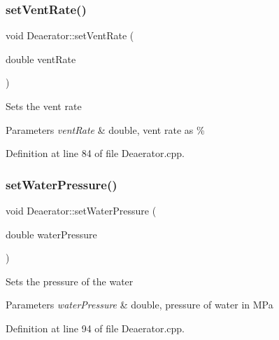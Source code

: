 \mbox{\label{class_deaerator_a11e71194f58763a57ec0f7d05a21782d}} 
\subsubsection{\texorpdfstring{set\+Vent\+Rate()}{setVentRate()}}
{\footnotesize\ttfamily void Deaerator\+::set\+Vent\+Rate (\begin{DoxyParamCaption}\item[{double}]{vent\+Rate }\end{DoxyParamCaption})}

Sets the vent rate 
\begin{DoxyParams}{Parameters}
{\em vent\+Rate} & double, vent rate as \% \\
\hline
\end{DoxyParams}


Definition at line 84 of file Deaerator.\+cpp.

\mbox{\label{class_deaerator_ae23f64c6983daed388a73c033a15e176}} 
\subsubsection{\texorpdfstring{set\+Water\+Pressure()}{setWaterPressure()}}
{\footnotesize\ttfamily void Deaerator\+::set\+Water\+Pressure (\begin{DoxyParamCaption}\item[{double}]{water\+Pressure }\end{DoxyParamCaption})}

Sets the pressure of the water 
\begin{DoxyParams}{Parameters}
{\em water\+Pressure} & double, pressure of water in M\+Pa \\
\hline
\end{DoxyParams}


Definition at line 94 of file Deaerator.\+cpp.

\mbox{\label{class_deaerator_ac60ad3d6650ed6c7783d18833bb7e3dd}} 
